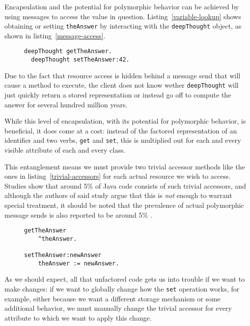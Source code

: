 \documentclass[preprint,authoryear]{acm_proc_article-sp}
\begin{document}
Encapsulation and the potential for polymorphic behavior can be achieved by using
messages to access the value in question.  Listing~\ref{variable-lookup} shows 
obtaining or setting {\tt theAnswer} by interacting with the {\tt deepThought}\cite{adams1997hitchhiker} object,
as shown in listing~\ref{message-access}.

\begin{figure}[htbp]
\begin{lstlisting}[style=L,label=message-access,caption=Asking an object.]
  deepThought getTheAnswer.
  deepThought setTheAnswer:42.
\end{lstlisting}
\end{figure}

Due to the fact that resource access is hidden behind a message send that will cause
a method to execute, the client does not know wether {\tt deepThought} will just
quickly return a stored representation or instead go off to compute the answer for 
several hundred million years. 

While this level of encapsulation, with its potential for polymorphic behavior, is 
beneficial, it does come at a cost:   instead of the factored 
representation of an identifier and two verbs, {\tt get} and {\tt set},
this is multiplied out for each and every visible attribute of 
each and every class. 
 
This entanglement means we  
must provide two trivial accessor methods like the ones in listing~\ref{trivial-accessors} for each actual resource we wish
to access.  Studies show that around 5\% of Java code consists of such trivial accessors\cite{Spinellis:2002:MPC:510857.510868}, and although the authors of said study argue that this is {\em not} enough
to warrant special treatment, it should be noted that the prevalence of actual polymorphic 
message sends is also reported to be around 5\% \cite{Holzle:1991:ODO:646149.679193}.

\begin{figure}[htbp]
\begin{lstlisting}[style=L,label=trivial-accessors,caption=Trivial accessors.]
getTheAnswer
    ^theAnswer.

setTheAnswer:newAnswer
    theAnswer := newAnswer.

\end{lstlisting}
\end{figure}

As we should expect, all that unfactored code gets us into trouble if we want 
to make changes:   if we want to globally change how the {\tt set}
operation works, for example, either because we want a different storage
mechanism or some additional behavior,
we must manually change the trivial accessor for every attribute to which
we want to apply this change.
\end{document}
